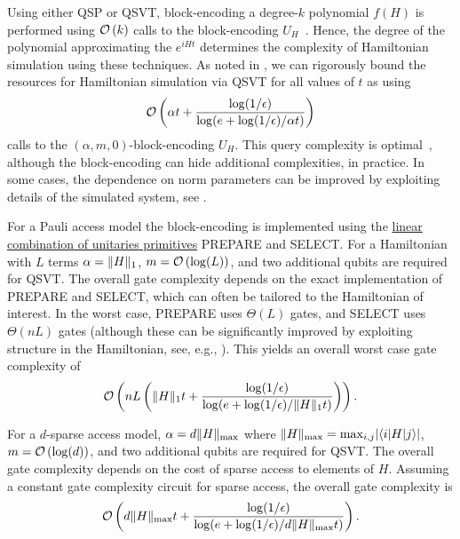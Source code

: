 \begin{refsection}
Using either QSP or QSVT, block-encoding a degree-$k$ polynomial $f(H)$ is performed using $\mathcal{O}\left( k \right)$ calls to the block-encoding $U_H$~\cite{low2016HamSimQubitization,gilyen2018QSingValTransfArXiv}. Hence, the degree of the polynomial approximating the $e^{iHt}$ determines the complexity of Hamiltonian simulation using these techniques.  
As noted in \cite[Corollary 60]{gilyen2018QSingValTransfArXiv}, we can rigorously bound the resources for Hamiltonian simulation via QSVT for all values of $t$ as using
\begin{equation}
\mathcal{O}\left(  \alpha t + \frac{\log(1/\epsilon)}{\log(e+ \log(1/\epsilon)/\alpha t)}   \right)
\end{equation}
calls to the $(\alpha, m, 0)$-block-encoding $U_H$. This query complexity is optimal~\cite{berry2005EffQAlgSimmSparseHam,gilyen2018QSingValTransfArXiv}, although the block-encoding can hide additional complexities, in practice. In some cases, the dependence on norm parameters can be improved by exploiting details of the simulated system, see \cite{low2017HamSimUnifAmp,low2018HamSimNearlyOptSpecNorm}.


For a Pauli access model the block-encoding is implemented using the \hyperref[prim:LCU]{linear combination of unitaries primitives} PREPARE and SELECT. For a Hamiltonian with $L$ terms $\alpha = \lVert H\rVert_1$, $m=\mathcal{O}\left( \log(L) \right)$, and two additional qubits are required for QSVT. The overall gate complexity depends on the exact implementation of PREPARE and SELECT, which can often be tailored to the Hamiltonian of interest. In the worst case, PREPARE uses $\Theta(L)$ gates, and SELECT uses $\Theta(nL)$ gates (although these can be significantly improved by exploiting structure in the Hamiltonian, see, e.g., \cite{babbush2018EncodingElectronicSpectraLinearT,Wan2021exponentiallyfaster}). This yields an overall worst case gate complexity of
\begin{equation}
    \mathcal{O}\left(  nL \left( \lVert H\rVert_1 t + \frac{\log(1/\epsilon)}{\log(e+ \log(1/\epsilon)/\lVert H\rVert_1 t)}  \right)  \right).
\end{equation}


For a $d$-sparse access model, $\alpha= d\lVert H\rVert_{\max}$ where $\lVert H\rVert_{\mathrm{max}} = \mathrm{max}_{i,j} \lvert \langle i\rvert H\lvert j\rangle \rvert$, $m=\mathcal{O}\left( \log(d) \right)$, and two additional qubits are required for QSVT. The overall gate complexity depends on the cost of sparse access to elements of $H$. Assuming a constant gate complexity circuit for sparse access, the overall gate complexity is
\begin{equation}
\mathcal{O}\left(  d\lVert H\rVert_{\max} t + \frac{\log(1/\epsilon)}{\log(e+ \log(1/\epsilon)/d\lVert H\rVert_{\max} t)}  \right).
\end{equation}



\end{refsection}
